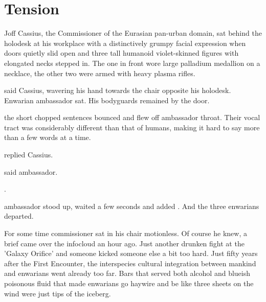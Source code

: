 \chapter{Tension}


Joff Cassius, the Commissioner of the Eurasian pan-urban domain, sat behind the holodesk at his workplace with a distinctively grumpy facial expression when doors quietly slid open and three tall humanoid violet-skinned figures with elongated necks stepped in. The one in front wore large palladium medallion on a necklace, the other two were armed with heavy plasma rifles.

 said Cassius, wavering his hand towards the chair opposite his holodesk. Enwarian ambassador sat. His bodyguards remained by the door.

 the short chopped sentences bounced and flew off ambassador throat. Their vocal tract was considerably different than that of humans, making it hard to say more than a few words at a time.

 replied Cassius. 

 said ambassador.

.

 ambassador stood up, waited a few seconds and added . And the three enwarians departed.

For some time commissioner sat in his chair motionless. Of course he knew, a brief came over the infocloud an hour ago. Just another drunken fight at the 'Galaxy Orifice' and someone kicked someone else a bit too hard. Just fifty years after the First Encounter, the interspecies cultural integration between mankind and enwarians went already too far. Bars that served both alcohol and blueish poisonous fluid that made enwarians go haywire and be like three sheets on the wind were just tips of the iceberg.

